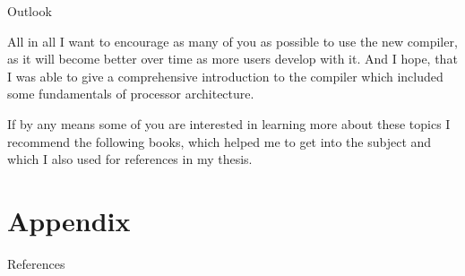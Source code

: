 \documentclass[10pt,aspectratio=169]{beamer}
\begin{document}
\begin{frame}[fragile]{Outlook}
{		All in all I want to encourage as many of you as possible to use the new compiler, as it will become better over time as more users develop with it.
		And I hope, that I was able to give a comprehensive introduction to the compiler which included some fundamentals of processor architecture.

		If by any means some of you are interested in learning more about these topics I recommend the following books, which helped me to get into the subject and which I also used for references in my thesis.
		
}
\end{frame}

\appendix



\section{Appendix}
\nocite{PPU}
\nocite{microprocessor}
\nocite{UBHD-67548259}
\nocite{UBHD-66483012}
\nocite{nuxmanual}
\nocite{GCCint}

\begin{frame}[fragile]{References}
	\vspace*{3em}
	{\scriptsize
	\printbibliography}
\end{frame}
\end{document}
